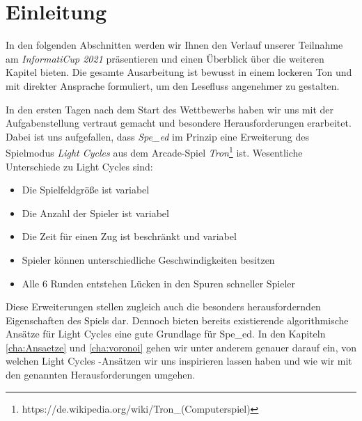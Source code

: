 \chapter{Einleitung}
\label{cha:Einleitung}

In den folgenden Abschnitten werden wir Ihnen den Verlauf unserer Teilnahme am \textit{InformatiCup 2021} präsentieren und einen Überblick über die weiteren Kapitel bieten. Die gesamte Ausarbeitung ist bewusst in einem lockeren Ton und mit direkter Ansprache formuliert, um den Lesefluss angenehmer zu gestalten.

In den ersten Tagen nach dem Start des Wettbewerbs haben wir uns mit der Aufgabenstellung vertraut gemacht und besondere Herausforderungen erarbeitet. Dabei ist uns aufgefallen, dass \textit{Spe\_ed} im Prinzip eine Erweiterung des Spielmodus \textit{Light Cycles} aus dem Arcade-Spiel \textit{Tron}\footnote{https://de.wikipedia.org/wiki/Tron\_(Computerspiel)} ist. Wesentliche Unterschiede zu Light Cycles sind:
\begin{itemize}
    \item Die Spielfeldgröße ist variabel
    \item Die Anzahl der Spieler ist variabel
    \item Die Zeit für einen Zug ist beschränkt und variabel
    \item Spieler können unterschiedliche Geschwindigkeiten besitzen
    \item Alle 6 Runden entstehen Lücken in den Spuren schneller Spieler
\end{itemize}
Diese Erweiterungen stellen zugleich auch die besonders herausfordernden Eigenschaften des Spiels dar. Dennoch bieten bereits existierende algorithmische Ansätze für Light Cycles eine gute Grundlage für Spe\_ed. In den Kapiteln \ref{cha:Ansaetze} und \ref{cha:voronoi} gehen wir unter anderem genauer darauf ein, von welchen Light Cycles -Ansätzen wir uns inspirieren lassen haben und wie wir mit den genannten Herausforderungen umgehen.

